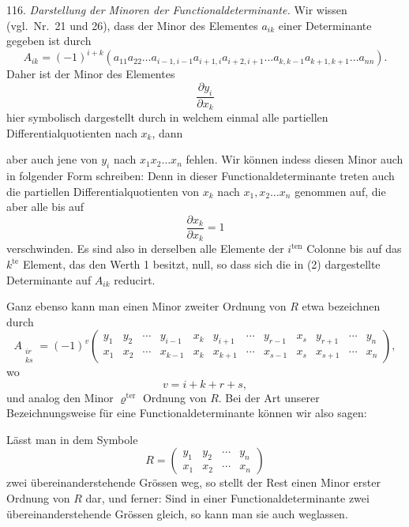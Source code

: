 116. \textit{Darstellung der Minoren der Functionaldeterminante.} Wir wissen (vgl.\ Nr.\ 21 und 26), dass der Minor des Elementes $a_{ik}$ einer Determinante gegeben ist durch
\[
A_{ik}=(-1)^{i+k}(a_{11}a_{22}\ldots a_{i-1,i-1}a_{i+1,i}a_{i+2,i+1}\ldots a_{k,k-1}a_{k+1,k+1}\ldots a_{nn}).
\]
Daher ist der Minor des Elementes
\[
\frac{\partial y_i}{\partial x_k}
\]
hier symbolisch dargestellt durch
in welchem einmal alle partiellen Differentialquotienten nach $x_k$, dann


aber auch jene von $y_i$ nach $x_1x_2\ldots x_n$ fehlen. Wir können indess diesen Minor auch in folgender Form schreiben:
Denn in dieser Functionaldeterminante treten auch die partiellen Differentialquotienten von $x_k$ nach $x_1,x_2\ldots x_n$ genommen auf, die aber alle bis auf
\[
\frac{\partial x_k}{\partial x_k}=1
\]
verschwinden. Es sind also in derselben alle Elemente der $i^{\text{ten}}$ Colonne bis auf das $k^{\text{te}}$ Element, das den Werth 1 besitzt, null, so dass sich die in (2) dargestellte Determinante auf $A_{ik}$ reducirt.

Ganz ebenso kann man einen Minor zweiter Ordnung von $R$ etwa bezeichnen durch
\[
A_{\substack{ir\\ks}}=(-1)^v\begin{pmatrix} y_1 & y_2 & \cdots & y_{i-1} & x_k & y_{i+1} & \cdots & y_{r-1} & x_s & y_{r+1} & \cdots & y_n\\ x_1 & x_2 & \cdots & x_{k-1} & x_k & x_{k+1} & \cdots & x_{s-1} & x_s & x_{s+1} & \cdots & x_n \end{pmatrix},
\]
wo
\[
v=i+k+r+s,
\]
und analog den Minor $\varrho^{\text{ter}}$ Ordnung von $R$. Bei der Art unserer Bezeichnungsweise für eine Functionaldeterminante können wir also sagen:

\glqq Lässt man in dem Symbole
\[
R=\begin{pmatrix} y_1 & y_2 & \cdots & y_n\\ x_1 & x_2 & \cdots & x_n \end{pmatrix}
\]
zwei übereinanderstehende Grössen weg, so stellt der Rest einen Minor erster Ordnung von $R$ dar, und ferner: Sind in einer Functionaldeterminante zwei übereinanderstehende Grössen gleich, so kann man sie auch weglassen.\grqq{}

